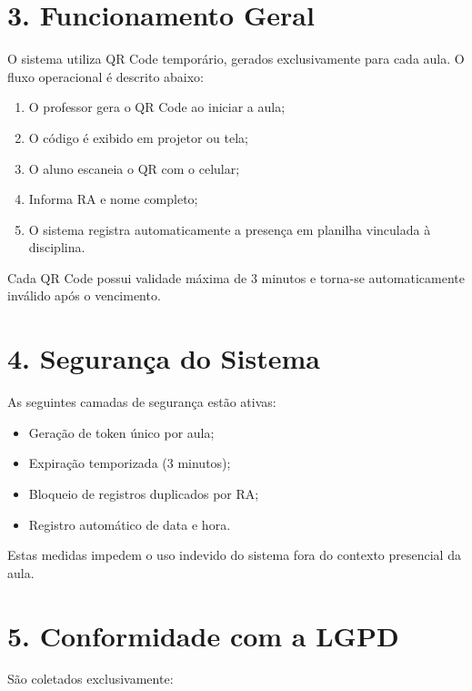 \documentclass[12pt,a4paper]{article}
\begin{document}
\section*{3. Funcionamento Geral}

O sistema utiliza QR Code temporário, gerados exclusivamente para cada aula. O fluxo operacional é descrito abaixo:

\begin{enumerate}
    \item O professor gera o QR Code ao iniciar a aula;
    \item O código é exibido em projetor ou tela;
    \item O aluno escaneia o QR com o celular;
    \item Informa RA e nome completo;
    \item O sistema registra automaticamente a presença em planilha vinculada à disciplina.
\end{enumerate}

Cada QR Code possui validade máxima de 3 minutos e torna-se automaticamente inválido após o vencimento.


\section*{4. Segurança do Sistema}

As seguintes camadas de segurança estão ativas:

\begin{itemize}
    \item Geração de token único por aula;
    \item Expiração temporizada (3 minutos);
    \item Bloqueio de registros duplicados por RA;
    \item Registro automático de data e hora.
\end{itemize}

Estas medidas impedem o uso indevido do sistema fora do contexto presencial da aula.


\section*{5. Conformidade com a LGPD}

São coletados exclusivamente:
\end{document}
